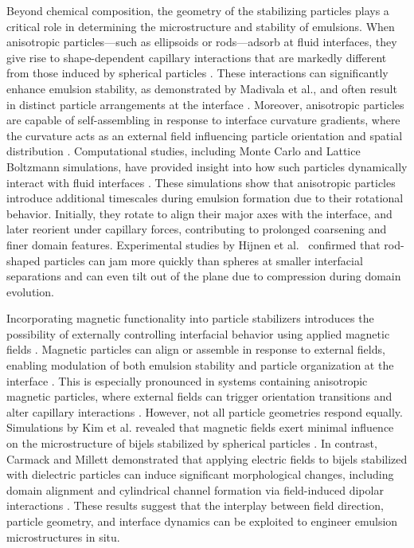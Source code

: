 Beyond chemical composition, the geometry of the stabilizing particles plays a critical role in determining 
the microstructure and stability of emulsions. When anisotropic particles—such as ellipsoids or rods—adsorb at 
fluid interfaces, they give rise to shape-dependent capillary interactions that are markedly different from those 
induced by spherical particles \cite{loudet_capillary_2005,madivala_exploiting_2009}. These interactions can 
significantly enhance emulsion stability, as demonstrated by Madivala et al., and often result in distinct particle 
arrangements at the interface \cite{madivala_self-assembly_2009}. Moreover, anisotropic particles are capable of 
self-assembling in response to interface curvature gradients, where the curvature acts as an external field influencing 
particle orientation and spatial distribution \cite{cavallaro_curvature-driven_2011, furst_directing_2011}. Computational 
studies, including Monte Carlo and Lattice Boltzmann simulations, have provided insight into how such particles dynamically 
interact with fluid interfaces \cite{bresme_orientational_2007, bresme_computer_2008, gunther_lattice_2013,gunther_timescales_2014}. 
These simulations show that anisotropic particles introduce additional timescales during 
emulsion formation due to their rotational behavior. Initially, they rotate to align their major axes with the interface, 
and later reorient under capillary forces, contributing to prolonged coarsening and finer domain features. Experimental studies 
by Hijnen et al.~\cite{hijnen_bijels_2015} confirmed that rod-shaped particles can jam more quickly than spheres at smaller 
interfacial separations and can even tilt out of the plane due to compression during domain evolution.

Incorporating magnetic functionality into particle stabilizers introduces the possibility of externally controlling interfacial 
behavior using applied magnetic fields \cite{melle_pickering_2005, zhou_magnetic_2011}. Magnetic particles can align or assemble 
in response to external fields, enabling modulation of both emulsion stability and particle organization at the interface 
\cite{dassanayake_structure_2000, leunissen_directing_2009}. This is especially pronounced in systems containing anisotropic magnetic 
particles, where external fields can trigger orientation transitions and alter capillary interactions 
\cite{morgan_understanding_2013, davies_interface_2014, davies_dipolar_2015}. However, not all particle geometries respond equally. 
Simulations by Kim et al. revealed 
that magnetic fields exert minimal influence on the microstructure of bijels stabilized by spherical particles \cite{kim_bijels_2010}. 
In contrast, Carmack and Millett demonstrated that applying electric fields to bijels stabilized with dielectric particles can induce 
significant morphological changes, including domain alignment and cylindrical channel formation via field-induced dipolar interactions 
\cite{carmack_tuning_2018}. These results suggest that the interplay between field direction, particle geometry, and interface dynamics 
can be exploited to engineer emulsion microstructures in situ.

